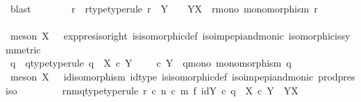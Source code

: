 \begin{isabellebody}
\ blast\isanewline
\ \ \ \ \ \ \isamarkupfalse%
\ r\ \ r{\isacharunderscore}{\kern0pt}type{\isacharbrackleft}{\kern0pt}type{\isacharunderscore}{\kern0pt}rule{\isacharbrackright}{\kern0pt}{\isacharcolon}{\kern0pt}\ {\isachardoublequoteopen}r\ {\isacharcolon}{\kern0pt}\ Y\isactrlbsup {\isasymOmega}\isactrlesup \ \ {\isasymrightarrow}\ \ Y\isactrlbsup X\isactrlesup {\isachardoublequoteclose}\ \ r{\isacharunderscore}{\kern0pt}mono{\isacharcolon}{\kern0pt}\ {\isachardoublequoteopen}monomorphism\ r{\isachardoublequoteclose}\isanewline
\ \ \ \ \ \ \ \ \isamarkupfalse%
\ {\isacharparenleft}{\kern0pt}meson\ {\isacartoucheopen}X\ {\isasymcong}\ {\isasymOmega}{\isacartoucheclose}\ exp{\isacharunderscore}{\kern0pt}pres{\isacharunderscore}{\kern0pt}iso{\isacharunderscore}{\kern0pt}right\ is{\isacharunderscore}{\kern0pt}isomorphic{\isacharunderscore}{\kern0pt}def\ iso{\isacharunderscore}{\kern0pt}imp{\isacharunderscore}{\kern0pt}epi{\isacharunderscore}{\kern0pt}and{\isacharunderscore}{\kern0pt}monic\ isomorphic{\isacharunderscore}{\kern0pt}is{\isacharunderscore}{\kern0pt}symmetric{\isacharparenright}{\kern0pt}\isanewline
\ \ \ \ \ \ \isamarkupfalse%
\ q\ \ q{\isacharunderscore}{\kern0pt}type{\isacharbrackleft}{\kern0pt}type{\isacharunderscore}{\kern0pt}rule{\isacharbrackright}{\kern0pt}{\isacharcolon}{\kern0pt}\ {\isachardoublequoteopen}q\ {\isacharcolon}{\kern0pt}\ X\ {\isasymtimes}\isactrlsub c\ Y\ \ {\isasymrightarrow}\ \ {\isasymOmega}\ {\isasymtimes}\isactrlsub c\ Y{\isachardoublequoteclose}\ \ q{\isacharunderscore}{\kern0pt}mono{\isacharcolon}{\kern0pt}\ {\isachardoublequoteopen}monomorphism\ q{\isachardoublequoteclose}\isanewline
\ \ \ \ \ \ \ \ \isamarkupfalse%
\ {\isacharparenleft}{\kern0pt}meson\ {\isacartoucheopen}X\ {\isasymcong}\ {\isasymOmega}{\isacartoucheclose}\ id{\isacharunderscore}{\kern0pt}isomorphism\ id{\isacharunderscore}{\kern0pt}type\ is{\isacharunderscore}{\kern0pt}isomorphic{\isacharunderscore}{\kern0pt}def\ iso{\isacharunderscore}{\kern0pt}imp{\isacharunderscore}{\kern0pt}epi{\isacharunderscore}{\kern0pt}and{\isacharunderscore}{\kern0pt}monic\ prod{\isacharunderscore}{\kern0pt}pres{\isacharunderscore}{\kern0pt}iso{\isacharparenright}{\kern0pt}\ \isanewline
\ \ \ \ \ \ \isamarkupfalse%
\ rnmq{\isacharunderscore}{\kern0pt}type{\isacharbrackleft}{\kern0pt}type{\isacharunderscore}{\kern0pt}rule{\isacharbrackright}{\kern0pt}{\isacharcolon}{\kern0pt}\ {\isachardoublequoteopen}r\ {\isasymcirc}\isactrlsub c\ n\ {\isasymcirc}\isactrlsub c\ {\isacharparenleft}{\kern0pt}m\ {\isasymtimes}\isactrlsub f\ id{\isacharparenleft}{\kern0pt}Y{\isacharparenright}{\kern0pt}{\isacharparenright}{\kern0pt}\ {\isasymcirc}\isactrlsub c\ q\ {\isacharcolon}{\kern0pt}\ X\ {\isasymtimes}\isactrlsub c\ Y\ {\isasymrightarrow}\ Y\isactrlbsup X\isactrlesup {\isachardoublequoteclose}\isanewline

\end{isabellebody}

